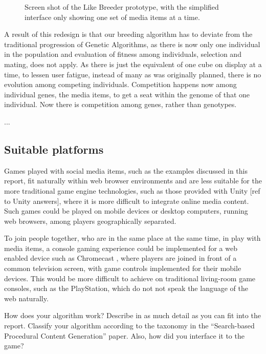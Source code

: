 \documentclass[]{article}
\begin{document}
\begin{figure}[htp]
	\caption{Screen shot of the Like Breeder prototype, with the simplified interface only showing one set of media items at a time.}
	\label{fig:likeBreeder}
\end{figure}

A result of this redesign is that our breeding algorithm has to deviate from the traditional progression of Genetic Algorithms, as there is now only one individual in the population and evaluation of fitness among individuals, selection and mating, does not apply.  As there is just the equivalent of one cube on display at a time, to lessen user fatigue, instead of many as was originally planned, there is no evolution among competing individuals.  Competition happens now among individual genes, the media items, to get a seat within the genome of that one individual.  Now there is competition among genes, rather than genotypes.


...


\subsection{Suitable platforms}

Games played with social media items, such as the examples discussed in this report, fit naturally within web browser environments and are less suitable for the more traditional game engine technologies, such as those provided with Unity [ref to Unity answers], where it is more difficult to integrate online media content.  Such games could be played on mobile devices or desktop computers, running web browsers, among players geographically separated.  

To join people together, who are in the same place at the same time, in play with media items, a console gaming experience could be implemented for a web enabled device such as Chromecast \cite{ChromecastGames}, where players are joined in front of a common television screen, with game controls implemented for their mobile devices.  This would be more difficult to achieve on traditional living-room game consoles, such as the PlayStation, which do not not speak the language of the web naturally.



\begin{framed}
How does your algorithm work? Describe in as much detail as you can fit into the report. Classify your algorithm according to the taxonomy in the “Search-based Procedural Content Generation” paper. Also, how did you interface it to the game?
\end{framed}
\end{document}
